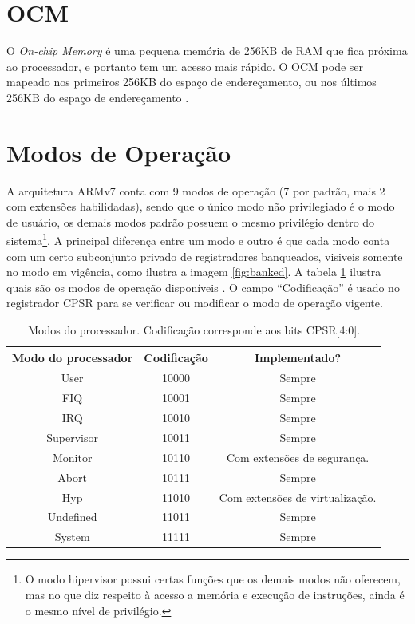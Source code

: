 \section{OCM} O \emph{On-chip Memory} é uma pequena memória de 256KB de RAM que fica próxima ao processador, e portanto tem um acesso mais rápido. O OCM pode ser mapeado nos primeiros 256KB do espaço de endereçamento, ou nos últimos 256KB do espaço de endereçamento \cite{ug585}.


\section{Modos de Operação}
\label{sec:operating_modes}
A arquitetura ARMv7 conta com 9 modos de operação (7 por padrão, mais 2 com extensões habilidadas), sendo que o único modo não privilegiado é o modo de usuário, os demais modos padrão possuem o mesmo privilégio dentro do sistema\footnote{O modo hipervisor possui certas funções que os demais modos não oferecem, mas no que diz respeito à acesso a memória e execução de instruções, ainda é o mesmo nível de privilégio.}. A principal diferença entre um modo e outro é que cada modo conta com um certo subconjunto privado de registradores banqueados, visiveis somente no modo em vigência, como ilustra a imagem \ref{fig:banked}. A tabela \ref{tab:processormode} ilustra quais são os modos de operação disponíveis \cite[p.~1139]{armarm}.
O campo ``Codificação'' é usado no registrador CPSR para se verificar ou modificar o modo de operação vigente.

\begin{table}[ht]
\centering
\begin{tabular}{ccc}
\hline\hline                        %
Modo do processador  & Codificação & Implementado?\\ [0.5ex] %
\hline                  %
User & 10000 & Sempre \\
FIQ & 10001 & Sempre \\
IRQ & 10010 & Sempre \\
Supervisor & 10011 & Sempre\\
Monitor & 10110 & Com extensões de segurança.\\
Abort & 10111 & Sempre\\
Hyp & 11010 & Com extensões de virtualização.\\
Undefined & 11011 & Sempre\\
System & 11111 & Sempre\\[1ex]
\hline %
\end{tabular}
\caption{Modos do processador. Codificação corresponde aos bits CPSR[4:0].}
\label{tab:processormode} %
\end{table}

